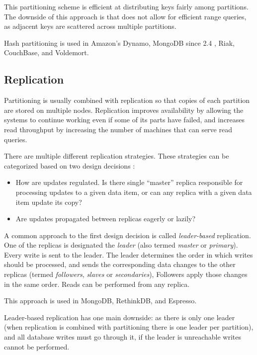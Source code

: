 This partitioning scheme is efficient at distributing keys fairly among partitions.
The downside of this approach is that does not allow for efficient range queries,
as adjacent keys are scattered across multiple partitions.

Hash partitioning is used in Amazon's Dynamo, MongoDB since 2.4 \cite{mongo:hashpartitioning}, Riak, CouchBase,
and Voldemort.

\subsection{Replication}
\label{sec:replication}

Partitioning is usually combined with replication so that copies of each partition are stored on multiple nodes.
Replication improves availability by allowing the systems to continue working even if some of its parts have failed,
and increases read throughput by increasing the number of machines that can serve read queries.

There are multiple different replication strategies.
These strategies can be categorized based on two design decisions \cite{gray:replication}:
\begin{itemize}
  \item How are updates regulated. Is there single ``master'' replica responsible for processing updates to a given data item,
  or can any replica with a given data item update its copy?
  \item Are updates propagated between replicas eagerly or lazily?
\end{itemize}

\bigskip
\noindent
A common approach to the first design decision is called \textit{leader-based} replication.
One of the replicas is designated the \textit{leader} (also termed \textit{master} or \textit{primary}).
Every write is sent to the leader.
The leader determines the order in which writes should be processed,
and sends the corresponding data changes to the other replicas
(termed \textit{followers}, \textit{slaves} or \textit{secondaries}),
Followers apply those changes in the same order.
Reads can be performed from any replica.

This approach is used in MongoDB, RethinkDB, and Espresso.

Leader-based replication has one main downside:
as there is only one leader (when replication is combined with partitioning there is one leader per partition),
and all database writes must go through it, if the leader is unreachable writes cannot be performed.

